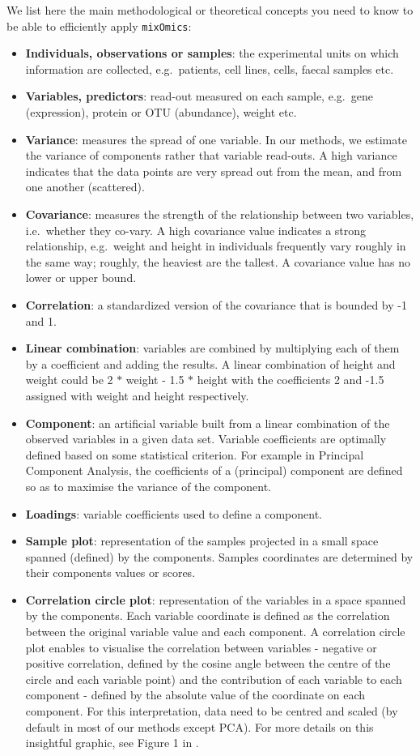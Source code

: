 \documentclass[]{book}
\begin{document}
We list here the main methodological or theoretical concepts you need to know to be able to efficiently apply \texttt{mixOmics}:

\begin{itemize}
\item
  \textbf{Individuals, observations or samples}: the experimental units on which information are collected, e.g.~patients, cell lines, cells, faecal samples etc.
\item
  \textbf{Variables, predictors}: read-out measured on each sample, e.g.~gene (expression), protein or OTU (abundance), weight etc.
\item
  \textbf{Variance}: measures the spread of one variable. In our methods, we estimate the variance of components rather that variable read-outs. A high variance indicates that the data points are very spread out from the mean, and from one another (scattered).
\item
  \textbf{Covariance}: measures the strength of the relationship between two variables, i.e.~whether they co-vary. A high covariance value indicates a strong relationship, e.g.~weight and height in individuals frequently vary roughly in the same way; roughly, the heaviest are the tallest. A covariance value has no lower or upper bound.
\item
  \textbf{Correlation}: a standardized version of the covariance that is bounded by -1 and 1.
\item
  \textbf{Linear combination}: variables are combined by multiplying each of them by a coefficient and adding the results. A linear combination of height and weight could be 2 \(*\) weight - 1.5 \(*\) height with the coefficients 2 and -1.5 assigned with weight and height respectively.
\item
  \textbf{Component}: an artificial variable built from a linear combination of the observed variables in a given data set. Variable coefficients are optimally defined based on some statistical criterion. For example in Principal Component Analysis, the coefficients of a (principal) component are defined so as to maximise the variance of the component.
\item
  \textbf{Loadings}: variable coefficients used to define a component.
\item
  \textbf{Sample plot}: representation of the samples projected in a small space spanned (defined) by the components. Samples coordinates are determined by their components values or scores.
\item
  \textbf{Correlation circle plot}: representation of the variables in a space spanned by the components. Each variable coordinate is defined as the correlation between the original variable value and each component. A correlation circle plot enables to visualise the correlation between variables - negative or positive correlation, defined by the cosine angle between the centre of the circle and each variable point) and the contribution of each variable to each component - defined by the absolute value of the coordinate on each component. For this interpretation, data need to be centred and scaled (by default in most of our methods except PCA). For more details on this insightful graphic, see Figure 1 in \citep{Gon12}.

\end{itemize}
\end{document}
